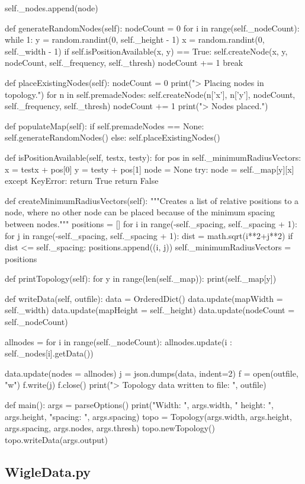 \begin{appendices}
\begin{python}
	self._nodes.append(node)

 def generateRandomNodes(self):
	nodeCount = 0
	for i in range(self._nodeCount): 
		while 1:
		y = random.randint(0, self._height - 1)
		x = random.randint(0, self._width - 1)
		if self.isPositionAvailable(x, y) == True:
			self.createNode(x, y, nodeCount, self._frequency, self._thresh)
			nodeCount += 1
			break

 def placeExistingNodes(self):
	nodeCount = 0
	print("> Placing nodes in topology.")
	for n in self.premadeNodes:
		self.createNode(n['x'], n['y'], nodeCount, self._frequency, self._thresh)
		nodeCount += 1
	print("> Nodes placed.")

 def populateMap(self): 
	if self.premadeNodes == None:
		self.generateRandomNodes()
	else:
		self.placeExistingNodes()

 def isPositionAvailable(self, testx, testy):
	for pos in self._minimumRadiusVectors:
		x = testx + pos[0]
		y = testy + pos[1]
		node = None
		try:
		node = self._map[y][x]
		except KeyError:
		return True
	return False

 def createMinimumRadiusVectors(self):
	"""Creates a list of relative positions to a node, where
	no other node can be placed because of the minimum spacing
	between nodes."""
	positions = []
	for i in range(-self._spacing, self._spacing + 1):
		for j in range(-self._spacing, self._spacing + 1): 
		dist = math.sqrt(i**2+j**2)
		if dist <=  self._spacing:
			positions.append((i, j))
	self._minimumRadiusVectors = positions

 def printTopology(self):
	for y in range(len(self._map)):
		print(self._map[y])

 def writeData(self, outfile):
	data  = OrderedDict()
	data.update(mapWidth = self._width)
	data.update(mapHeight = self._height)
	data.update(nodeCount = self._nodeCount)

	allnodes = {}
	for i in range(self._nodeCount):
		allnodes.update({i : self._nodes[i].getData()})

	data.update(nodes = allnodes)
	j = json.dumps(data, indent=2) 
	f = open(outfile, "w")
	f.write(j)
	f.close()
	print("> Topology data written to file: ", outfile)

def main(): 
 args = parseOptions()
 print("Width: ", args.width, " height: ", args.height, "spacing: ", args.spacing)
 topo = Topology(args.width, args.height, args.spacing, args.nodes, args.thresh)
 topo.newTopology()
 topo.writeData(args.output)



\end{python}
\subsection{WigleData.py}

\end{appendices}


